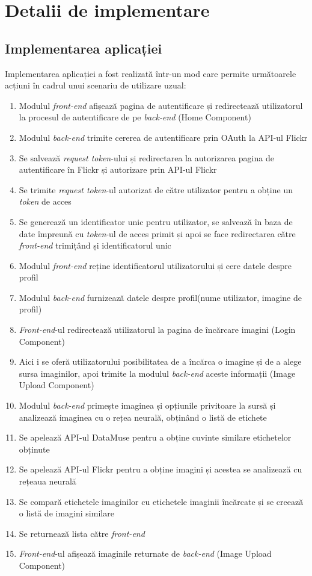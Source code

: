 \chapter{Detalii de implementare}
\section{Implementarea aplicației}

Implementarea aplicației a fost realizată într-un mod care permite următoarele acțiuni în cadrul unui scenariu de utilizare uzual:
\begin{enumerate}
    \item Modulul \textit{front-end} afișează pagina de autentificare și redirectează utilizatorul la procesul de autentificare de pe \textit{back-end} (Home Component)
    \item Modulul \textit{back-end} trimite cererea de autentificare prin OAuth la API-ul Flickr
    \item  Se salvează \textit{request token}-ului și redirectarea la autorizarea pagina de autentificare în Flickr și autorizare prin API-ul Flickr
    \item Se trimite \textit{request token}-ul autorizat de către utilizator pentru a obține un \textit{token} de acces
    \item  Se generează un identificator unic pentru utilizator, se salvează în baza de date împreună cu \textit{token}-ul de acces primit și apoi se face redirectarea către \textit{front-end} trimițând și identificatorul unic
    \item Modulul \textit{front-end} reține identificatorul utilizatorului și cere  datele despre profil 
    \item Modulul \textit{back-end} furnizează datele despre profil(nume utilizator, imagine de profil)
    \item \textit{Front-end}-ul redirectează utilizatorul la pagina de încărcare imagini (Login Component)
    \item Aici i se oferă utilizatorului posibilitatea de a încărca o imagine și de a alege sursa imaginilor, apoi trimite la modulul \textit{back-end} aceste informații (Image Upload Component)
    \item Modulul \textit{back-end} primește imaginea și opțiunile privitoare la sursă și  analizează imaginea cu o rețea neurală, obținând o listă de etichete
    \item Se apelează API-ul DataMuse pentru a obține cuvinte similare etichetelor obținute
    \item Se apelează API-ul Flickr pentru a obține imagini și acestea se  analizează cu rețeaua neurală
    \item Se compară etichetele imaginilor cu etichetele imaginii încărcate și se creează o listă de imagini similare
    \item Se returnează lista către \textit{front-end}
    \item \textit{Front-end}-ul afișează imaginile returnate de \textit{back-end} (Image Upload Component)
\end{enumerate}{}


